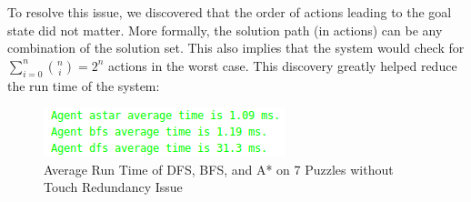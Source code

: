 To resolve this issue, we discovered that the order of actions leading to the goal state did not matter. More formally, the solution path (in actions) can be any combination of the solution set. This also implies that the system would check for $\sum_{i=0}^{n} {n\choose{i}} = 2^n$ actions in the worst case. This discovery greatly helped reduce the run time of the system:


\begin{figure}[H]
\includegraphics[width=0.75\linewidth]{assets/touch_redundancy_2.png}
\caption{Average Run Time of DFS, BFS, and A* on 7 Puzzles without Touch Redundancy Issue} \label{fig4}
\end{figure}